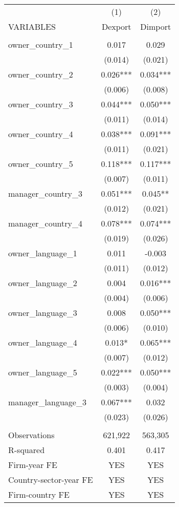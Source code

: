 \begin{tabular}{lcc} \hline
 & (1) & (2) \\
VARIABLES & Dexport & Dimport \\ \hline
 &  &  \\
owner\_country\_1 & 0.017 & 0.029 \\
 & (0.014) & (0.021) \\
owner\_country\_2 & 0.026*** & 0.034*** \\
 & (0.006) & (0.008) \\
owner\_country\_3 & 0.044*** & 0.050*** \\
 & (0.011) & (0.014) \\
owner\_country\_4 & 0.038*** & 0.091*** \\
 & (0.011) & (0.021) \\
owner\_country\_5 & 0.118*** & 0.117*** \\
 & (0.007) & (0.011) \\
manager\_country\_3 & 0.051*** & 0.045** \\
 & (0.012) & (0.021) \\
manager\_country\_4 & 0.078*** & 0.074*** \\
 & (0.019) & (0.026) \\
owner\_language\_1 & 0.011 & -0.003 \\
 & (0.011) & (0.012) \\
owner\_language\_2 & 0.004 & 0.016*** \\
 & (0.004) & (0.006) \\
owner\_language\_3 & 0.008 & 0.050*** \\
 & (0.006) & (0.010) \\
owner\_language\_4 & 0.013* & 0.065*** \\
 & (0.007) & (0.012) \\
owner\_language\_5 & 0.022*** & 0.050*** \\
 & (0.003) & (0.004) \\
manager\_language\_3 & 0.067*** & 0.032 \\
 & (0.023) & (0.026) \\
 &  &  \\
Observations & 621,922 & 563,305 \\
R-squared & 0.401 & 0.417 \\
Firm-year FE & YES & YES \\
Country-sector-year FE & YES & YES \\
 Firm-country FE & YES & YES \\ \hline
\end{tabular}
